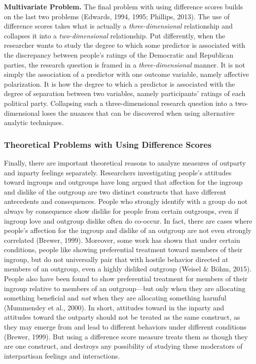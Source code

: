 \documentclass[authordate, meta, issue]{jote-new-article}
\begin{document}
	\textbf{Multivariate Problem. }The final problem with using difference scores builds on the last two problems (Edwards, 1994, 1995; Phillips, 2013). The use of difference scores takes what is actually a \emph{three-dimensional }relationship and collapses it into a \emph{two-dimensional }relationship. Put differently, when the researcher wants to study the degree to which some predictor is associated with the discrepancy between people's ratings of the Democratic and Republican parties, the research question is framed in a \emph{three-dimensional }manner. It is not simply the association of a predictor with one outcome variable, namely affective polarization. It is how the degree to which a predictor is associated with the degree of separation between two variables, namely participants' ratings of each political party. Collapsing such a three-dimensional research question into a two-dimensional loses the nuances that can be discovered when using alternative analytic techniques.



	\subsubsection{Theoretical Problems with Using Difference Scores}



	Finally, there are important theoretical reasons to analyze measures of outparty and inparty feelings separately. Researchers investigating people's attitudes toward ingroups and outgroups have long argued that affection for the ingroup and dislike of the outgroup are two distinct constructs that have different antecedents and consequences. People who strongly identify with a group do not always by consequence show dislike for people from certain outgroups, even if ingroup love and outgroup dislike often do co-occur. In fact, there are cases where people's affection for the ingroup and dislike of an outgroup are not even strongly correlated (Brewer, 1999). Moreover, some work has shown that under certain conditions, people like showing preferential treatment toward members of their ingroup, but do not universally pair that with hostile behavior directed at members of an outgroup, even a highly disliked outgroup (Weisel \& Böhm, 2015). People also have been found to show preferential treatment for members of their ingroup relative to members of an outgroup—but only when they are allocating something beneficial and \emph{not }when they are allocating something harmful (Mummendey et al., 2000). In short, attitudes toward in the inparty and attitudes toward the outparty should not be treated as the same construct, as they may emerge from and lead to different behaviors under different conditions (Brewer, 1999). But using a difference score measure treats them as though they are one construct, and destroys any possibility of studying these moderators of interpartisan feelings and interactions.
\end{document}
